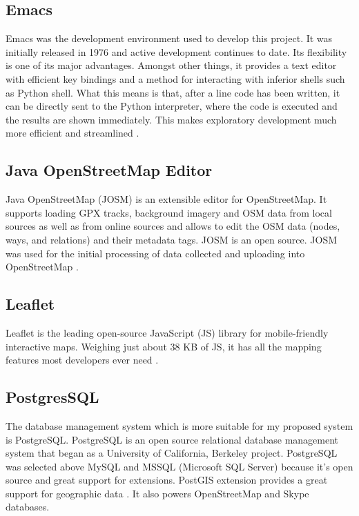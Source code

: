 \subsection{Emacs}
Emacs was the development environment used to develop this project. It was initially released in 1976 and active development continues to date. Its flexibility is one of its major advantages. Amongst other things, it provides a text editor with efficient key bindings and a method for interacting with inferior shells such as Python shell. What this means is that, after a line code has been written, it can be directly sent to the Python interpreter, where the code is executed and the results are shown immediately. This makes exploratory development much more efficient and streamlined \citep{stallman1981emacs}. 

\subsection{Java OpenStreetMap Editor}
Java OpenStreetMap (JOSM) is an extensible editor for OpenStreetMap. It supports loading GPX tracks, background imagery and OSM data from local sources as well as from online sources and allows to edit the OSM data (nodes, ways, and relations) and their metadata tags. JOSM is an open source. JOSM was used for the initial processing of data collected and uploading into OpenStreetMap \citep{ciepluch2009using}.

\subsection{Leaflet}
Leaflet is the leading open-source JavaScript (JS) library for mobile-friendly interactive maps. Weighing just about 38 KB of JS, it has all the mapping features most developers ever need \citep{cheng2017leaflet}.

\subsection{PostgresSQL}
The database management system which is more suitable for my proposed system is PostgreSQL. PostgreSQL is an open source relational database management system that began as a University of California, Berkeley project. PostgreSQL was selected above MySQL and MSSQL (Microsoft SQL Server) because it's open source and great support for extensions. PostGIS extension provides a great support for geographic data \citep{obe2011postgis}. It also powers OpenStreetMap and Skype databases.

